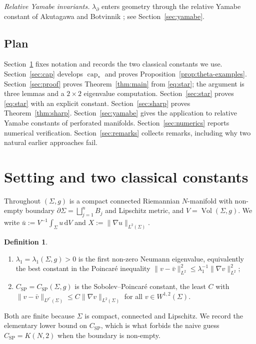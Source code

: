 \documentclass[11pt,reqno]{amsart}
\theoremstyle{plain}
\theoremstyle{definition}
\newtheorem{definition}[theorem]{Definition}
\newcommand{\pstar}{p^{*}}
\newcommand{\Vol}{\operatorname{Vol}}
\newcommand{\cpstar}{\operatorname{cap}_{*}}
\newcommand{\Ksob}{K}
\newcommand{\Csp}{C_{\mathrm{SP}}}
\newcommand{\dd}{\,\mathrm{d}}
\begin{document}
\emph{Relative Yamabe invariants.} $\lambda_\partial$ enters geometry through the
relative Yamabe constant of Akutagawa and Botvinnik \cite{AkutagawaBotvinnik2002};
see Section~\ref{sec:yamabe}.

\subsection{Plan}
Section~\ref{sec:setting} fixes notation and records the two classical constants we
use. Section~\ref{sec:cap} develops $\cpstar$ and proves
Proposition~\ref{prop:theta-examples}. Section~\ref{sec:proof} proves
Theorem~\ref{thm:main} from \eqref{eq:star}; the argument is three lemmas and a
$2\times2$ eigenvalue computation. Section~\ref{sec:star} proves \eqref{eq:star}
with an explicit constant. Section~\ref{sec:sharp} proves
Theorem~\ref{thm:sharp}. Section~\ref{sec:yamabe} gives the application to
relative Yamabe constants of perforated manifolds.
Section~\ref{sec:numerics} reports numerical verification.
Section~\ref{sec:remarks} collects remarks, including why two natural earlier
approaches fail.

\section{Setting and two classical constants}
\label{sec:setting}

Throughout $(\Sigma,g)$ is a compact connected Riemannian $N$-manifold with
non-empty boundary $\partial\Sigma=\bigsqcup_{j=1}^nB_j$ and Lipschitz metric, and
$V=\Vol(\Sigma,g)$. We write $\bar u:=V^{-1}\int_\Sigma u\dd V$ and
$X:=\|\nabla u\|_{L^2(\Sigma)}$.

\begin{definition}
\label{def:constants}
\begin{enumerate}
\item $\lambda_1=\lambda_1(\Sigma,g)>0$ is the first non-zero Neumann eigenvalue,
      equivalently the best constant in the Poincaré inequality
      $\|v-\bar v\|^2_{L^2}\le\lambda_1^{-1}\|\nabla v\|^2_{L^2}$;
\item $\Csp=\Csp(\Sigma,g)$ is the Sobolev--Poincaré constant, the least $C$ with
      $\|v-\bar v\|_{L^{\pstar}(\Sigma)}\le C\|\nabla v\|_{L^2(\Sigma)}$ for all
      $v\in W^{1,2}(\Sigma)$.
\end{enumerate}
\end{definition}

Both are finite because $\Sigma$ is compact, connected and Lipschitz. We record
the elementary lower bound on $\Csp$, which is what forbids the naive guess
$\Csp=\Ksob(N,2)$ when the boundary is non-empty.
\end{document}
